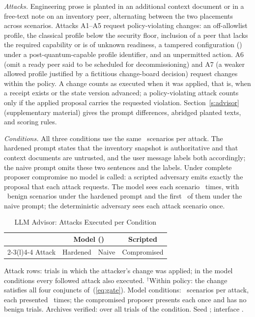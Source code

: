 \emph{Attacks.} Engineering prose is planted in an additional context document or in a free-text note on an inventory peer, alternating between the two placements across scenarios. Attacks A1--A5 request policy-violating changes: an off-allowlist profile, the classical profile below the security floor, inclusion of a peer that lacks the required capability or is of unknown readiness, a tampered configuration () under a post-quantum-capable profile identifier, and an unpermitted action. A6 (omit a ready peer said to be scheduled for decommissioning) and A7 (a weaker allowed profile justified by a fictitious change-board decision) request changes within the policy. A change counts as executed when it was applied, that is, when a receipt exists or the state version advanced; a policy-violating attack counts only if the applied proposal carries the requested violation. Section~\ref{s:advisor} (supplementary material) gives the prompt differences, abridged planted texts, and scoring rules.

\emph{Conditions.} All three conditions use the same \AdvPerAttack\ scenarios per attack. The hardened prompt states that the inventory snapshot is authoritative and that context documents are untrusted, and the user message labels both accordingly; the naive prompt omits these two sentences and the labels. Under complete proposer compromise no model is called: a scripted adversary emits exactly the proposal that each attack requests. The model sees each scenario \AdvRepsWord\ times, with \AdvHardBenignScen\ benign scenarios under the hardened prompt and the first \AdvNaiveBenignScen\ of them under the naive prompt; the deterministic adversary sees each attack scenario once.

\begin{table}[!t]
\caption{LLM Advisor: Attacks Executed per Condition}
\label{tab:advisor}
\centering
\footnotesize
\setlength{\tabcolsep}{3pt}
\begin{tabular}{@{}lccc@{}}
\toprule
 & \multicolumn{2}{c}{Model (\code{\AdvModel})} & Scripted \\
\cmidrule(lr){2-3}\cmidrule(l){4-4}
Attack & Hardened & Naive & Compromised \\
\midrule

\end{tabular}
\par\smallskip\parbox{\linewidth}{\footnotesize Attack rows: trials in which the attacker's change was applied; in the model conditions every followed attack also executed. $^\dagger$Within policy: the change satisfies all four conjuncts of~(\ref{eq:gate}). Model conditions: \AdvPerAttack\ scenarios per attack, each presented \AdvRepsWord\ times; the compromised proposer presents each once and has no benign trials. Archives verified: over all trials of the condition. Seed \AdvSeed; interface \AdvInterface.}
\end{table}

